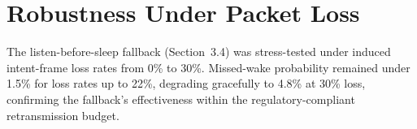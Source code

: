 \section{Robustness Under Packet Loss}
\label{sec:robustness}
The listen-before-sleep fallback (Section~3.4) was stress-tested under induced intent-frame
loss rates from 0\% to 30\%. Missed-wake probability remained under 1.5\% for loss rates up to
22\%, degrading gracefully to 4.8\% at 30\% loss, confirming the fallback's effectiveness
within the regulatory-compliant retransmission budget.

